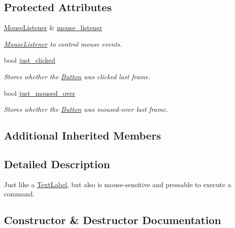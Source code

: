 \subsection*{Protected Attributes}
\begin{DoxyCompactItemize}
\item 
\mbox{\label{class_button_aab6aafaa6740925acb9c69c62f68aa7e}} 
\mbox{\hyperlink{class_mouse_listener}{Mouse\+Listener}} \& \mbox{\hyperlink{class_button_aab6aafaa6740925acb9c69c62f68aa7e}{mouse\+\_\+listener}}
\begin{DoxyCompactList}\small\item\em \mbox{\hyperlink{class_mouse_listener}{Mouse\+Listener}} to control mouse events. \end{DoxyCompactList}\item 
\mbox{\label{class_button_a004237b359d7783fdfa3c7fc132dcd11}} 
bool \mbox{\hyperlink{class_button_a004237b359d7783fdfa3c7fc132dcd11}{just\+\_\+clicked}}
\begin{DoxyCompactList}\small\item\em Stores whether the \mbox{\hyperlink{class_button}{Button}} was clicked last frame. \end{DoxyCompactList}\item 
\mbox{\label{class_button_a14e3262785a4dea5cded2c6542c09f2b}} 
bool \mbox{\hyperlink{class_button_a14e3262785a4dea5cded2c6542c09f2b}{just\+\_\+moused\+\_\+over}}
\begin{DoxyCompactList}\small\item\em Stores whether the \mbox{\hyperlink{class_button}{Button}} was moused-\/over last frame. \end{DoxyCompactList}\end{DoxyCompactItemize}
\subsection*{Additional Inherited Members}


\subsection{Detailed Description}
Just like a \mbox{\hyperlink{class_text_label}{Text\+Label}}, but also is mouse-\/sensitive and pressable to execute a command. 

\subsection{Constructor \& Destructor Documentation}
\mbox{\label{class_button_a228b18e1d494f3d443d9a42ad16d5568}} 
